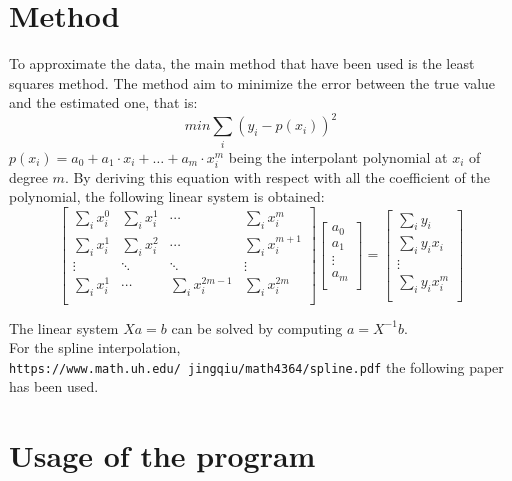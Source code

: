 \documentclass[12pt]{article}
\begin{document}
 \section{Method}
 To approximate the data, the main method that have been used is the least squares method. The method aim to minimize the error between the true value and the estimated one, that is:
 \begin{equation}
 min \sum_i (y_i - p(x_i))^2
 \end{equation}
 $p(x_i) = a_0 + a_1\cdot x_i+ \ldots +a_m\cdot x_i^m$ being the interpolant polynomial at $x_i$ of degree $m$.
 By deriving this equation with respect with all the coefficient of the polynomial, the following linear system is obtained:
 \begin{equation}
\left[ \begin{array}{cccc}
\sum_i x_i^0 & \sum_i x_i^1 & \cdots & \sum_i x_i^m \\
\sum_i x_i^1 & \sum_i x_i^2 & \cdots & \sum_i x_i^{m+1} \\
\vdots & \ddots & \ddots & \vdots \\
\sum_i x_i^1& \cdots & \sum_i x_i^{2m-1} & \sum_i x_i^{2m}\\
\end{array} \right]
\left[ \begin{array}{c}
a_0 \\
a_1\\
\vdots\\
a_m\\
\end{array} \right] = 
\left[ \begin{array}{c}
\sum_i y_i  \\
\sum_i y_i x_i\\
\vdots\\
\sum_i y_i x_i^m\\
\end{array} \right]
\end{equation}
 
The linear system $Xa=b$ can be solved by computing $a = X^{-1}b$.\\
For the spline interpolation, \texttt{https://www.math.uh.edu/~jingqiu/math4364/spline.pdf} the following paper has been used.
 
\section{Usage of the program}
\end{document}
